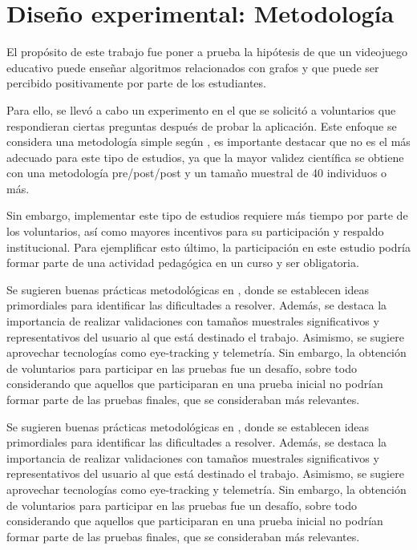 \chapter{Diseño experimental: Metodología}

El propósito de este trabajo fue poner a prueba la hipótesis de que un videojuego educativo puede enseñar algoritmos relacionados con grafos y que puede ser percibido positivamente por parte de los estudiantes.

Para ello, se llevó a cabo un experimento en el que se solicitó a voluntarios que respondieran ciertas preguntas después de probar la aplicación. Este enfoque se considera una metodología simple según \cite{HowGamesComputingEducationEvaluated}, es importante destacar que no es el más adecuado para este tipo de estudios, ya que la mayor validez científica se obtiene con una metodología pre/post/post y un tamaño muestral de 40 individuos o más.

Sin embargo, implementar este tipo de estudios requiere más tiempo por parte de los voluntarios, así como mayores incentivos para su participación y respaldo institucional. Para ejemplificar esto último, la participación en este estudio podría formar parte de una actividad pedagógica en un curso y ser obligatoria.

Se sugieren buenas prácticas metodológicas en \cite{Rogers2002InteractionDesign, MeegaPlusManual, HowGamesComputingEducationEvaluated}, donde se establecen ideas primordiales para identificar las dificultades a resolver. Además, se destaca la importancia de realizar validaciones con tamaños muestrales significativos y representativos del usuario al que está destinado el trabajo. Asimismo, se sugiere aprovechar tecnologías como eye-tracking y telemetría. Sin embargo, la obtención de voluntarios para participar en las pruebas fue un desafío, sobre todo considerando que aquellos que participaran en una prueba inicial no podrían formar parte de las pruebas finales, que se consideraban más relevantes.

Se sugieren buenas prácticas metodológicas en \cite{Rogers2002InteractionDesign, MeegaPlusManual, HowGamesComputingEducationEvaluated}, donde se establecen ideas primordiales para identificar las dificultades a resolver. Además, se destaca la importancia de realizar validaciones con tamaños muestrales significativos y representativos del usuario al que está destinado el trabajo. Asimismo, se sugiere aprovechar tecnologías como eye-tracking y telemetría. Sin embargo, la obtención de voluntarios para participar en las pruebas fue un desafío, sobre todo considerando que aquellos que participaran en una prueba inicial no podrían formar parte de las pruebas finales, que se consideraban más relevantes.


